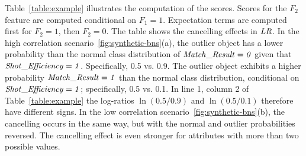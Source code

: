 {\begin{table}[hbpt]
			\centering
				\end{table}
				
			



%
% 
Table~\ref{table:example} illustrates the computation of the scores. Scores for the $F_{2}$ feature are computed conditional on $F_{1} = 1$. Expectation terms are computed first for $F_{2} = 1$, then $F_{2} = 0$.
The table shows the %
cancelling effects in $\it{LR}$. In the high correlation scenario~\ref{fig:synthetic-bns}(a), the outlier object has a lower probability than the normal class distribution of $\it{Match\_Result} = 0$ given that $\it{Shot\_Efficiency} = 1$. Specifically, 0.5 vs. 0.9. The outlier object exhibits a higher probability $\it{Match\_Result} = 1$ than the normal class distribution, conditional on $\it{Shot\_Efficiency} = 1$; specifically, 0.5 vs. 0.1. In line 1, column 2 of Table~\ref{table:example}  the log-ratios $\ln(0.5/0.9)$ and $\ln(0.5/0.1)$ therefore have different signs. In the low correlation scenario~\ref{fig:synthetic-bns}(b), the cancelling occurs in the same way, but with the normal and outlier probabilities reversed. 
The cancelling effect is even stronger for attributes with more than two possible values.

}
